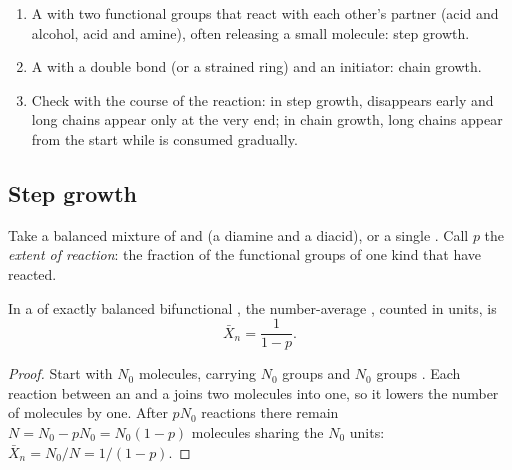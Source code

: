 \begin{method}\label{met:b2:polymer-synthesis:classify}
\begin{enumerate}
  \item A  with two functional groups that react with each other's partner (acid and alcohol,
        acid and amine), often releasing a small molecule: step growth.
  \item A  with a  double bond (or a strained ring) and an initiator: chain growth.
  \item Check with the course of the reaction: in step growth,  disappears early and long chains
        appear only at the very end; in chain growth, long chains appear from the start while 
        is consumed gradually.
\end{enumerate}
\end{method}

\subsection*{Step growth}

Take a balanced mixture of  and   (a diamine and a diacid), or a single
 . Call $p$ the \emph{extent of reaction}: the fraction of the functional groups of one
kind that have reacted.

\begin{theorem}\label{thm:b2:polymer-synthesis:carothers}
In a  of exactly balanced bifunctional , the number-average , counted in  units, is
\begin{equation*}
\bar X_n = \frac{1}{1 - p}.
\end{equation*}
\end{theorem}

\begin{proof}
Start with $N_0$  molecules, carrying $N_0$ groups  and $N_0$ groups . Each reaction
between an  and a  joins two molecules into one, so it lowers the number of molecules by
one. After $pN_0$ reactions there remain $N = N_0 - pN_0 = N_0(1-p)$ molecules sharing the $N_0$ 
units: $\bar X_n = N_0/N = 1/(1-p)$.
\end{proof}


